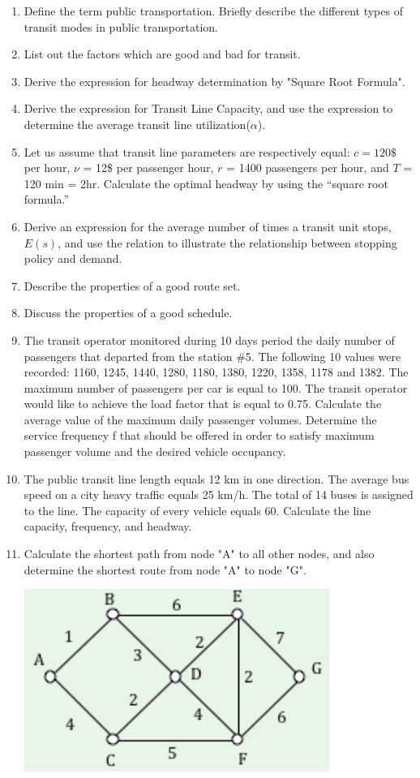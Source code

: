 \begin{enumerate}
	\item Define the term public transportation. Briefly describe the different types of transit modes in public transportation.
	\item List out the factors which are good and bad for transit.
	\item Derive the expression for headway determination by "Square Root Formula".
	\item Derive the expression for Transit Line Capacity, and use the expression to determine the average transit line utilization($\alpha$).
	\item Let us assume that transit line parameters are respectively equal: $ c = 120\$ $ per hour, $\nu$ = 12\$ per passenger hour, $r$ = 1400 passengers per hour, and $T$ = 120 min = 2hr. Calculate the optimal headway by using the “square root formula.”
	\item Derive an expression for the average number of times a transit
	unit stops, $ E(s) $, and use the relation to illustrate the relationship between stopping policy and demand.
	\item Describe the properties of a good route set.
	\item Discuss the properties of a good schedule.
	\item The transit operator monitored during 10 days period the daily number of passengers that departed from the station \#5. The following 10 values were recorded: 1160, 1245, 1440, 1280, 1180, 1380, 1220, 1358, 1178 and 1382. The maximum number of passengers per car is equal to 100. The transit operator would like to achieve the load factor that is equal to 0.75. Calculate the average value of the maximum daily passenger volumes. Determine the service frequency f that should be offered in order to satisfy maximum passenger volume and the desired vehicle occupancy.
	\item The public transit line length equals 12 km in one direction. The average bus speed on a city heavy traffic equals 25 km/h. The total of 14 buses is assigned to the line. The capacity of every vehicle equals 60. Calculate the line capacity, frequency, and headway.
	\item Calculate the shortest path from node "A" to all other nodes, and also determine the shortest route from node "A" to node "G".
	\begin{center}
		\includegraphics{gfx/fig32.png}

\end{center}
\end{enumerate}
